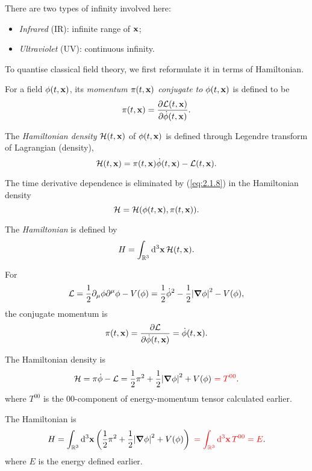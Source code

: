 \documentclass[a4paper,11pt]{article}
\begin{document}
	\begin{nt}
		There are two types of infinity involved here:
		\begin{itemize}
			\item \emph{Infrared} (IR): infinite range of $\vb x$;
			\item \emph{Ultraviolet} (UV): continuous infinity.
		\end{itemize}
	\end{nt}

	To quantise classical field theory, we first reformulate it in terms of Hamiltonian.

	\begin{defi}
		For a field $\phi(t, \vb x)$, its \emph{momentum $\pi(t, \vb x)$ conjugate to $\phi(t, \vb x)$} is defined to be
		\begin{equation}
			\pi (t, \vb x) = \pdv{\mathcal{L}(t,\vb x)}{\dot \phi(t,\vb x)}.
		\end{equation}
	\end{defi}
	
	\begin{defi}
		The \emph{Hamiltonian density} $\mathcal{H}(t,\vb x)$ of $\phi(t,\vb x)$ is defined through Legendre transform of Lagrangian (density),
		\begin{equation}
			\mathcal{H}(t,\vb x) = \pi(t,\vb x) \dot \phi(t,\vb x) - \mathcal{L}(t,\vb x).
			\label{eq:2.1.8}
		\end{equation}
	\end{defi}
	\begin{nt}
		The time derivative dependence is eliminated by (\ref{eq:2.1.8}) in the Hamiltonian density
		\[
			\mathcal{H} = \mathcal{H}(\phi(t,\vb x), \pi(t,\vb x)).
		\]
	\end{nt}

	\begin{defi}
		The \emph{Hamiltonian} is defined by
		\begin{equation*}
			H = \int _{\mathbb{R}^3} \dd[3]{\vb x} \mathcal{H}(t, \vb x).
		\end{equation*}
	\end{defi}

	\begin{ex}
		For 
		\[
			\mathcal{L} = \frac{1}{2} \partial_\mu \phi \partial^\mu \phi - V(\phi) = \frac{1}{2} \dot \phi ^2 - \frac{1}{2} \abs{\grad \phi}^2 - V(\phi),
		\]
		the conjugate momentum is
		\[
			\pi(t,\vb x) = \pdv{\mathcal{L}}{\dot \phi(t,\vb x)} = \dot \phi(t, \vb x).
		\]

		The Hamiltonian density is
		\[
			\mathcal{H} = \pi \dot \phi - \mathcal{L} = \frac{1}{2} \pi^2 + \frac{1}{2} \abs{\grad \phi}^2 + V(\phi) {\color{red}\ = T ^{00}} .
		\]
		where $T ^{00}$ is the $00$-component of energy-momentum tensor calculated earlier.

		The Hamiltonian is
		\[
			H = \int _{\mathbb{R}^3} \dd[3]{\vb x} \left(  \frac{1}{2} \pi^2 + \frac{1}{2} \abs{\grad \phi}^2 + V(\phi) \right) {\color{red}\ = \int _{\mathbb{R}^3} \dd[3]{\vb x} T ^{00} = E}.
		\]
		where $E$ is the energy defined earlier.
	\end{ex}
\end{document}
